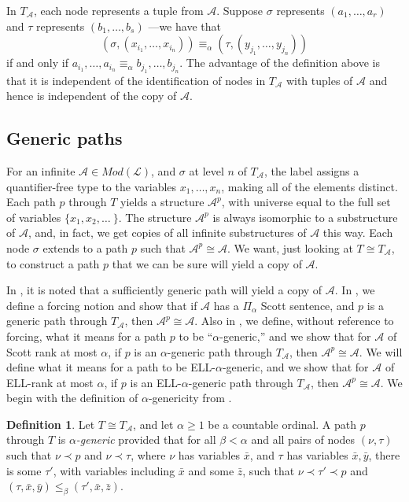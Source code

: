 \documentclass[10pt,a4paper]{article}
\newcommand{\ELL}{\textnormal{ELL}}
\theoremstyle{definition}
\newtheorem{defn}[thm]{Definition}
\begin{document}
	
	In $T_{\mathcal{A}}$, each node represents a tuple from $\mathcal{A}$.  Suppose $\sigma$ represents $(a_1,\ldots,a_r)$ and $\tau$ represents $(b_1,\ldots,b_s)$  ---we have that \[(\sigma,(x_{i_1},\ldots,x_{i_n})) \equiv_\alpha (\tau,(y_{j_1},\ldots,y_{j_n}))\]
	if and only if $a_{i_1},\ldots,a_{i_n} \equiv_\alpha b_{j_1},\ldots,b_{j_n}$. The advantage of the definition above is that it is independent of the identification of nodes in $T_{\mathcal{A}}$ with tuples of $\mathcal{A}$ and hence is independent of the copy of $\mathcal{A}$.
	
	\subsection{Generic paths}
	
	For an infinite $\mathcal{A}\in Mod(\mathcal{L})$, and $\sigma$ at level $n$ of $T_\mathcal{A}$, the label assigns a quantifier-free type to the variables $x_1,\ldots,x_n$, making all of the elements distinct. Each path $p$ through $T$ yields a structure $\mathcal{A}^p$, with universe equal to the full set of variables $\{x_1,x_2,\ldots\ \}$. The structure $\mathcal{A}^p$ is always isomorphic to a substructure of $\mathcal{A}$, and, in fact, we get copies of all infinite substructures of $\mathcal{A}$ this way. Each node $\sigma$ extends to a path $p$ such that $\mathcal{A}^p\cong\mathcal{A}$. We want, just looking at $T\cong T_\mathcal{A}$, to construct a path $p$ that we can be sure will yield a copy of $\mathcal{A}$. 
	
	In \cite{HTMontalban}, it is noted that a sufficiently generic path will yield a copy of $\mathcal{A}$. 
	In \cite{GonzalezKnight}, we define a forcing notion and show that if $\mathcal{A}$ has a $\Pi_\alpha$ Scott sentence, and $p$ is a generic path through $T_\mathcal{A}$, then $\mathcal{A}^p\cong\mathcal{A}$. Also in \cite{GonzalezKnight}, we define, without reference to forcing, what it means for a path $p$ to be ``$\alpha$-generic,'' and we show that for $\mathcal{A}$ of Scott rank at most $\alpha$, if $p$ is an $\alpha$-generic path through $T_\mathcal{A}$, then $\mathcal{A}^p\cong\mathcal{A}$. 
	We will define what it means for a path to be \ELL-$\alpha$-generic, and we show that for $\mathcal{A}$ of \ELL-rank at most $\alpha$, if $p$ is an \ELL-$\alpha$-generic path through $T_\mathcal{A}$, then $\mathcal{A}^p\cong\mathcal{A}$. 
	We begin with the definition of $\alpha$-genericity from \cite{GonzalezKnight}. 
	
	\begin{defn}
		Let $T \cong T_\mathcal{A}$, and let $\alpha\geq 1$ be a countable ordinal. A path $p$ through $T$ is \emph{$\alpha$-generic} provided that for all $\beta < \alpha$ and all pairs of nodes $(\nu,\tau)$ such that $\nu\prec p$ and $\nu\prec\tau$, where $\nu$ has variables $\bar{x}$, and $\tau$ has variables $\bar{x},\bar{y}$, there is some $\tau'$, with variables including $\bar{x}$ and some $\bar{z}$, such that $\nu\prec\tau'\prec p$ and $(\tau,\bar{x},\bar{y})\leq_\beta (\tau',\bar{x},\bar{z})$. 
	\end{defn}
	
\end{document}

